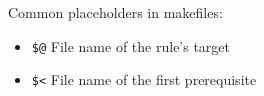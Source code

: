 Common placeholders in makefiles:
\begin{itemize}
	\item \texttt{\$@}	File name of the rule's target
	\item \texttt{\$<}	File name of the first prerequisite
\end{itemize}



